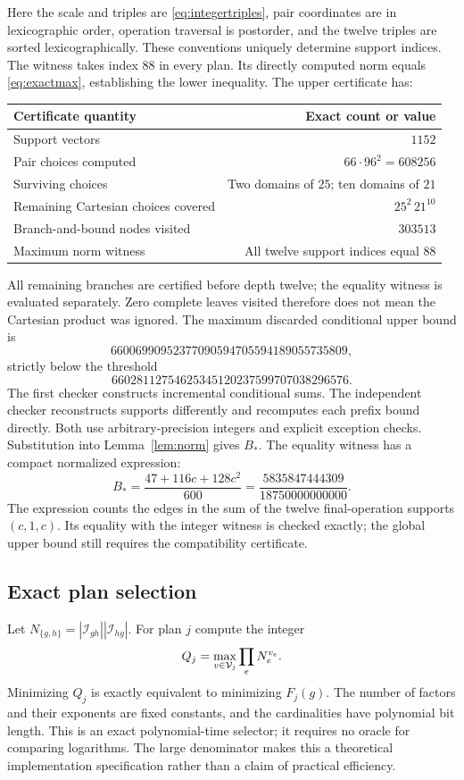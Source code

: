 Here the scale and triples are \eqref{eq:integertriples}, pair coordinates
are in lexicographic order, operation traversal is postorder, and the twelve
triples are sorted lexicographically. These conventions uniquely determine
support indices. The witness takes index \(88\) in every plan.
Its directly computed norm equals \eqref{eq:exactmax}, establishing the
lower inequality. The upper certificate has:

\begin{center}
\begin{tabular}{@{}lr@{}}
\toprule
Certificate quantity & Exact count or value\\
\midrule
Support vectors & \(1152\)\\
Pair choices computed & \(66\cdot96^2=608256\)\\
Surviving choices & Two domains of \(25\); ten domains of \(21\)\\
Remaining Cartesian choices covered & \(25^2\,21^{10}\)\\
Branch-and-bound nodes visited & \(303513\)\\
Maximum norm witness & All twelve support indices equal \(88\)\\
\bottomrule
\end{tabular}
\end{center}

All remaining branches are certified before depth twelve; the equality
witness is evaluated separately. Zero complete leaves visited therefore
does not mean the Cartesian product was ignored.
The maximum discarded conditional upper bound is
\[
 66006990952377090594705594189055735809,
\]
strictly below the threshold
\[
 66028112754625345120237599707038296576.
\]
The first checker constructs incremental conditional sums. The independent
checker reconstructs supports differently and recomputes each prefix
bound directly. Both use arbitrary-precision integers and explicit
exception checks. Substitution into Lemma~\ref{lem:norm} gives \(B_*\).
The equality witness has a compact normalized expression:
\[
 B_*=\frac{47+116c+128c^2}{600}
     =\frac{5835847444309}{18750000000000}.
\]
The expression counts the edges in the sum of the twelve final-operation
supports \((c,1,c)\). Its equality with the integer witness is checked
exactly; the global upper bound still requires the compatibility certificate.

\subsection{Exact plan selection}

Let \(N_{\{g,h\}}=|\mathcal I_{gh}||\mathcal I_{hg}|\). For plan \(j\)
compute the integer
\[
 Q_j=\max_{v\in\mathcal V_j}\prod_e N_e^{v_e}.
\]
Minimizing \(Q_j\) is exactly equivalent to minimizing \(F_j(g)\).
The number of factors and their exponents are fixed constants, and the
cardinalities have polynomial bit length. This is an exact polynomial-time
selector; it requires no oracle for comparing logarithms. The large
denominator makes this a theoretical implementation specification rather
than a claim of practical efficiency.

